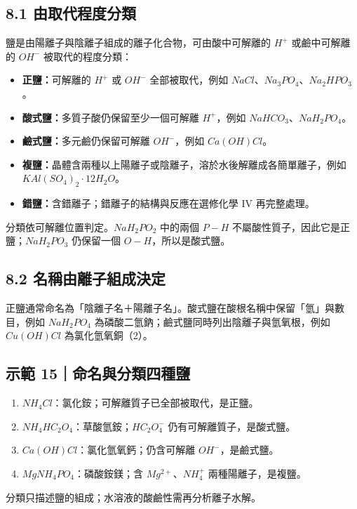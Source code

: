 \documentclass[11pt,a4paper]{article}
\providecommand{\tightlist}{%
  \setlength{\itemsep}{0pt}\setlength{\parskip}{0pt}}
\begin{document}
\subsection{8.1 由取代程度分類}\label{ux7531ux53d6ux4ee3ux7a0bux5ea6ux5206ux985e}

鹽是由陽離子與陰離子組成的離子化合物，可由酸中可解離的 \(H^+\) 或鹼中可解離的 \(OH^-\) 被取代的程度分類：

\begin{itemize}
\tightlist
\item
  \textbf{正鹽：}可解離的 \(H^+\) 或 \(OH^-\) 全部被取代，例如 \(NaCl\)、\(Na_3PO_4\)、\(Na_2HPO_3\)。
\item
  \textbf{酸式鹽：}多質子酸仍保留至少一個可解離 \(H^+\)，例如 \(NaHCO_3\)、\(NaH_2PO_4\)。
\item
  \textbf{鹼式鹽：}多元鹼仍保留可解離 \(OH^-\)，例如 \(Ca(OH)Cl\)。
\item
  \textbf{複鹽：}晶體含兩種以上陽離子或陰離子，溶於水後解離成各簡單離子，例如 \(KAl(SO_4)_2\cdot12H_2O\)。
\item
  \textbf{錯鹽：}含錯離子；錯離子的結構與反應在選修化學 IV 再完整處理。
\end{itemize}

分類依可解離位置判定。\(NaH_2PO_2\) 中的兩個 \(P-H\) 不屬酸性質子，因此它是正鹽；\(NaH_2PO_3\) 仍保留一個 \(O-H\)，所以是酸式鹽。

\subsection{8.2 名稱由離子組成決定}\label{ux540dux7a31ux7531ux96e2ux5b50ux7d44ux6210ux6c7aux5b9a}

正鹽通常命名為「陰離子名＋陽離子名」。酸式鹽在酸根名稱中保留「氫」與數目，例如 \(NaH_2PO_4\) 為磷酸二氫鈉；鹼式鹽同時列出陰離子與氫氧根，例如 \(Cu(OH)Cl\) 為氯化氫氧銅（2）。

\begin{HandoutWorkedExample}

\subsection{示範 15｜命名與分類四種鹽}\label{ux793aux7bc4-15ux547dux540dux8207ux5206ux985eux56dbux7a2eux9e7d}

\begin{enumerate}
\def\labelenumi{\arabic{enumi}.}
\tightlist
\item
  \(NH_4Cl\)：氯化銨；可解離質子已全部被取代，是正鹽。
\item
  \(NH_4HC_2O_4\)：草酸氫銨；\(HC_2O_4^-\) 仍有可解離質子，是酸式鹽。
\item
  \(Ca(OH)Cl\)：氯化氫氧鈣；仍含可解離 \(OH^-\)，是鹼式鹽。
\item
  \(MgNH_4PO_4\)：磷酸銨鎂；含 \(Mg^{2+}\)、\(NH_4^+\) 兩種陽離子，是複鹽。
\end{enumerate}

分類只描述鹽的組成；水溶液的酸鹼性需再分析離子水解。

\end{HandoutWorkedExample}
\end{document}
